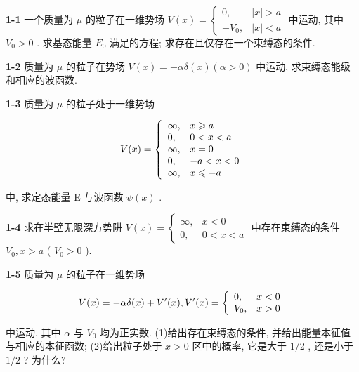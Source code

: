 \textbf{1-1} 一个质量为 $\mu$ 的粒子在一维势场 $V(x) = \begin{cases} 0, & |x| > a \\ -V_0, & |x| < a \end{cases}$ 中运动, 其中 $V_0 > 0$ . 求基态能量 $E_0$ 满足的方程; 求存在且仅存在一个束缚态的条件.

\vfill

\newpage
\vfill


\textbf{1-2} 质量为 $\mu$ 的粒子在势场 $V(x) = -\alpha \delta (x)(\alpha >0)$ 中运动, 求束缚态能级和相应的波函数.

\vfill

\newpage
\vfill


\textbf{1-3} 质量为 $\mu$ 的粒子处于一维势场

$$
V (x) = \left\{ \begin{array}{l l} \infty , & x \geqslant a \\ 0, & 0 <   x <   a \\ \infty , & x = 0 \\ 0, & - a <   x <   0 \\ \infty , & x \leqslant - a \end{array} \right.
$$

中, 求定态能量 E 与波函数 $\psi(x)$ .

\vfill

\newpage
\vfill


\textbf{1-4} 求在半壁无限深方势阱 $V(x) = \begin{cases} \infty, & x < 0 \\ 0, & 0 < x < a \end{cases}$ 中存在束缚态的条件 $V_0, x > a$ ( $V_0 > 0$ ).

\vfill

\newpage
\vfill


\textbf{1-5} 质量为 $\mu$ 的粒子在一维势场

$$
V (x) = - \alpha \delta (x) + V ^ {\prime} (x), V ^ {\prime} (x) = \left\{ \begin{array}{l l} 0, & x <   0 \\ V _ {0}, & x > 0 \end{array} \right.
$$

中运动, 其中 $\alpha$ 与 $V_{0}$ 均为正实数. (1)给出存在束缚态的条件, 并给出能量本征值与相应的本征函数; (2)给出粒子处于 $x > 0$ 区中的概率, 它是大于 $1/2$ , 还是小于 $1/2$ ? 为什么?

\vfill

\newpage
\vfill


